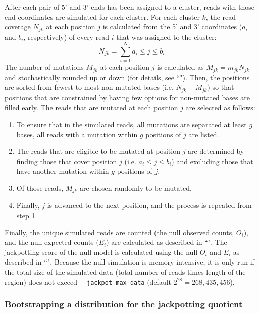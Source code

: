 \documentclass{article}
\begin{document}
After each pair of 5' and 3' ends has been assigned to a cluster, reads with those end coordinates are simulated for each cluster.
For each cluster $k$, the read coverage $N_{jk}$ at each position $j$ is calculated from the 5' and 3' coordinates ($a_i$ and $b_i$, respectively) of every read $i$ that was assigned to the cluster:
\begin{equation}
    N_{jk} = \sum_{i=1}^N{a_i \le j \le b_i}
\end{equation}
The number of mutations $M_{jk}$ at each position $j$ is calculated as $M_{jk} = m_{jk} N_{jk}$ and stochastically rounded up or down (for details, see ``").
Then, the positions are sorted from fewest to most non-mutated bases (i.e. $N_{jk} - M_{jk}$) so that positions that are constrained by having few options for non-mutated bases are filled early.
The reads that are mutated at each position $j$ are selected as follows:
\begin{enumerate}
    \item To ensure that in the simulated reads, all mutations are separated at least $g$ bases, all reads with a mutation within $g$ positions of $j$ are listed.
    \item The reads that are eligible to be mutated at position $j$ are determined by finding those that cover position $j$ (i.e. $a_i \le j \le b_i$) and excluding those that have another mutation within $g$ positions of $j$.
    \item Of those reads, $M_{jk}$ are chosen randomly to be mutated.
    \item Finally, $j$ is advanced to the next position, and the process is repeated from step 1.
\end{enumerate}

Finally, the unique simulated reads are counted (the null observed counts, $O_i$), and the null expected counts ($E_i$) are calculated as described in ``".
The jackpotting score of the null model is calculated using the null $O_i$ and $E_i$ as described in ``".
Because the null simulation is memory-intensive, it is only run if the total size of the simulated data (total number of reads times length of the region) does not exceed \verb|--jackpot-max-data| (default $2^{28} = 268,435,456$).

\subsubsection{Bootstrapping a distribution for the jackpotting quotient}
\end{document}

